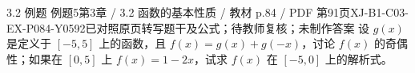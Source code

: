 \par\noindent\begin{minipage}{\linewidth}
\begin{bankitem}{3.2 例题 例题5}{第3章 / 3.2 函数的基本性质 / 教材 p.84 / PDF 第91页}{XJ-B1-C03-EX-P084-Y0592}{已对照原页转写题干及公式；待教师复核；未制作答案}
设 $g(x)$ 是定义于 $[-5,5]$ 上的函数，且 $f(x)=g(x)+g(-x)$，讨论 $f(x)$ 的奇偶性；如果在 $[0,5]$ 上 $f(x)=1-2x$，试求 $f(x)$ 在 $[-5,0]$ 上的解析式。
\end{bankitem}
\end{minipage}\par\medskip
